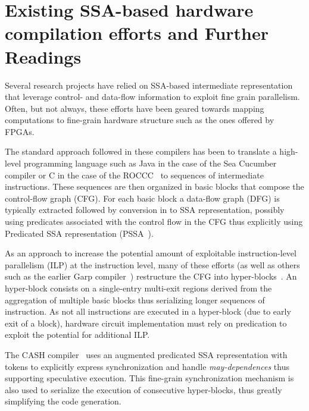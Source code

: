 \section{Existing SSA-based hardware compilation efforts and Further Readings}
Several research projects have relied on SSA-based intermediate representation 
that leverage control- and data-flow information to exploit fine grain parallelism. 
Often, but not always, these efforts have been geared towards mapping computations 
to fine-grain hardware structure such as the ones offered by FPGAs.

The standard approach followed in these compilers has been to translate a high-level programming language such as Java in the case of the Sea Cucumber~\cite{Tripp:FPL02} compiler or C in the case of the ROCCC~\cite{Najjar:ROCCC08} to sequences of intermediate instructions. 
These sequences are then organized in basic blocks that compose the control-flow graph (CFG). 
For each basic block a data-flow graph (DFG) is typically extracted followed by conversion in to SSA representation, possibly using predicates associated with the control flow in the CFG thus explicitly using Predicated SSA representation (PSSA~\cite{Carter:PACT99,deFerriere:SCOPES07,Stoutchinin:2001:MICRO}).

As an approach to increase the potential amount of exploitable instruction-level parallelism (ILP) at the instruction level, many of these efforts (as well as others such as the earlier Garp compiler~\cite{Callahan:Computer00}) restructure the CFG into hyper-blocks~\cite{Mahlke:Micro92}. 
An hyper-block consists on a single-entry multi-exit regions derived from the aggregation of multiple basic blocks thus serializing longer sequences of instruction. 
As not all instructions are executed in a hyper-block (due to early exit of a block), hardware circuit implementation must rely on predication to exploit the potential for additional ILP. 


The CASH compiler~\cite{Budiu:FPL02} uses an augmented predicated SSA representation with tokens to explicitly express synchronization and handle {\em may-dependences} thus supporting speculative execution. 
This fine-grain synchronization mechanism is also used to serialize the execution of consecutive hyper-blocks, thus greatly simplifying the code generation.\\

